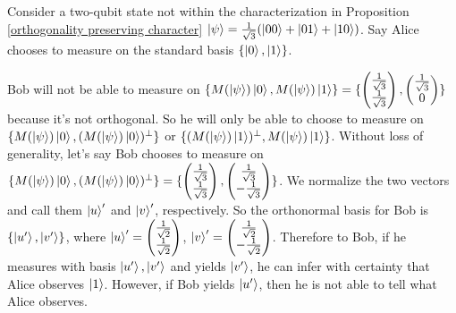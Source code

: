 \begin{example}
Consider a two-qubit state not within the characterization in Proposition \ref{orthogonality preserving character} $\ket{\psi}=\frac{1}{\sqrt{3}}(\ket{00}+\ket{01}+\ket{10})$. Say Alice chooses to measure on the standard basis $\{\ket{0}, \ket{1}\}$.
\end{example}
Bob will not be able to measure on $\{M(\ket{\psi})\ket{0}, M(\ket{\psi})\ket{1}\}=\{\begin{pmatrix}
\frac{1}{\sqrt{3}}\\
\frac{1}{\sqrt{3}}
\end{pmatrix},\begin{pmatrix}
\frac{1}{\sqrt{3}}\\
0
\end{pmatrix}\}$ because it's not orthogonal. So he will only be able to choose to measure on $\{M(\ket{\psi})\ket{0}, (M(\ket{\psi})\ket{0})^\perp \}$ or $\{(M(\ket{\psi})\ket{1})^\perp, M(\ket{\psi})\ket{1} \}$.
Without loss of generality, let's say Bob chooses to measure on $\{M(\ket{\psi})\ket{0}, (M(\ket{\psi})\ket{0})^\perp \}=\{\begin{pmatrix}
\frac{1}{\sqrt{3}}\\
\frac{1}{\sqrt{3}}
\end{pmatrix}, \begin{pmatrix}
\frac{1}{\sqrt{3}}\\
-\frac{1}{\sqrt{3}}
\end{pmatrix}\}$.
We normalize the two vectors and call them $\ket{u}'$ and $\ket{v}'$, respectively. So the orthonormal basis for Bob is $\{\ket{u'}, \ket{v'}\}$, where $\ket{u}'=\begin{pmatrix}
\frac{1}{\sqrt{2}}\\
\frac{1}{\sqrt{2}}
\end{pmatrix}$, $\ket{v}'=\begin{pmatrix}
\frac{1}{\sqrt{2}}\\
-\frac{1}{\sqrt{2}}
\end{pmatrix}$. Therefore to Bob, if he measures with basis $\ket{u'}, \ket{v'}$ and yields $\ket{v'}$, he can infer with certainty that Alice observes $\ket{1}$. However, if Bob yields $\ket{u'}$, then he is not able to tell what Alice observes.

